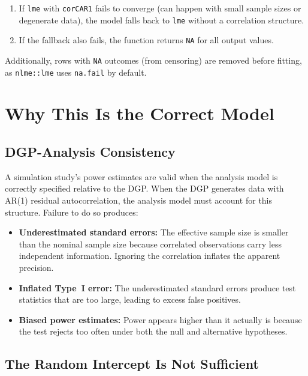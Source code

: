 \documentclass[11pt]{article}
\begin{document}
\begin{enumerate}
\item If \texttt{lme} with \texttt{corCAR1} fails to
  converge (can happen with small sample sizes or
  degenerate data), the model falls back to \texttt{lme}
  without a correlation structure.
\item If the fallback also fails, the function returns
  \texttt{NA} for all output values.
\end{enumerate}

Additionally, rows with \texttt{NA} outcomes (from censoring)
are removed before fitting, as \texttt{nlme::lme} uses
\texttt{na.fail} by default.

\section{Why This Is the Correct Model}

\subsection{DGP-Analysis Consistency}

A simulation study's power estimates are valid when the
analysis model is correctly specified relative to the DGP.
When the DGP generates data with AR(1) residual
autocorrelation, the analysis model must account for this
structure. Failure to do so produces:

\begin{itemize}
\item \textbf{Underestimated standard errors:} The effective
  sample size is smaller than the nominal sample size because
  correlated observations carry less independent information.
  Ignoring the correlation inflates the apparent precision.
\item \textbf{Inflated Type~I error:} The underestimated
  standard errors produce test statistics that are too large,
  leading to excess false positives.
\item \textbf{Biased power estimates:} Power appears higher
  than it actually is because the test rejects too often
  under both the null and alternative hypotheses.
\end{itemize}

\subsection{The Random Intercept Is Not Sufficient}
\end{document}
